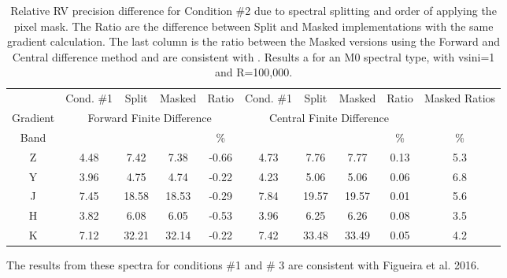 
\begin{table}
    \caption{Relative RV precision difference for Condition \#2 due to spectral splitting and order of applying the pixel mask. The Ratio are the difference between Split and Masked implementations with the same gradient calculation. The last column is the ratio between the Masked versions using the Forward and Central difference method and are consistent with . Results a for an M0 spectral type, with vsini=1 and R=100,000.}
    \begin{tabular}{c|cccc|cccc|c}
        \toprule
        & Cond. \#1 & Split & Masked & Ratio &  Cond. \#1 & Split & Masked & Ratio & Masked Ratios\\
        Gradient &  \multicolumn{4}{c|}{Forward Finite Difference}  &  \multicolumn{4}{c|}{Central Finite Difference} & \\
        
        Band & \mps{} & \mps{} & \mps{} &  \%  & \mps{} & \mps{} & \mps{} &   \% & \% \\
        \midrule
   
        Z & 4.48 &  7.42 &  7.38 & -0.66 &  4.73 &  7.76 &  7.77 & 0.13 & 5.3\\
        Y & 3.96 &  4.75 &  4.74 & -0.22 &  4.23 &  5.06 &  5.06 & 0.06 & 6.8\\
        J & 7.45 & 18.58 & 18.53 & -0.29 &  7.84 & 19.57 & 19.57 & 0.01 & 5.6\\
        H & 3.82 &  6.08 &  6.05 & -0.53 &  3.96 &  6.25 &  6.26 & 0.08 & 3.5\\
        K & 7.12 & 32.21 & 32.14 & -0.22 &  7.42 & 33.48 & 33.49 & 0.05 & 4.2\\
        \bottomrule
    \end{tabular}
\end{table}

{\rd The results from these spectra for conditions \#1 and \# 3 are consistent with Figueira et al. 2016. }